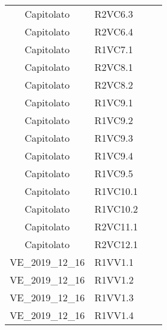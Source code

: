 {\begin{longtable}{ c C{4cm} c c}
Capitolato & R2VC6.3\\

Capitolato & R2VC6.4\\

Capitolato & R1VC7.1\\

Capitolato & R2VC8.1\\

Capitolato & R2VC8.2\\

Capitolato & R1VC9.1\\

Capitolato & R1VC9.2\\

Capitolato & R1VC9.3\\

Capitolato & R1VC9.4\\

Capitolato & R1VC9.5\\

Capitolato & R1VC10.1\\

Capitolato & R1VC10.2\\

Capitolato & R2VC11.1\\

Capitolato & R2VC12.1\\


VE\_2019\_12\_16 & R1VV1.1\\

VE\_2019\_12\_16 & R1VV1.2\\

VE\_2019\_12\_16 & R1VV1.3\\

VE\_2019\_12\_16 & R1VV1.4\\


\end{longtable}
}


